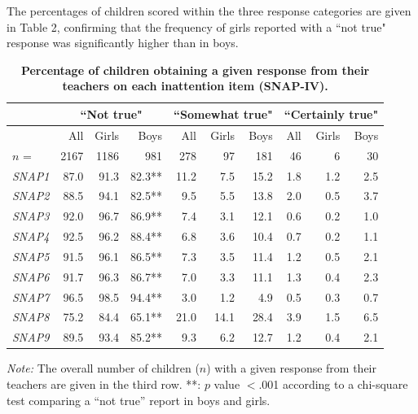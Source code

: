 \documentclass[10pt,letterpaper]{article}
\begin{document}
The percentages of children scored within the three response categories are given in Table 2, confirming that the  frequency of girls reported with a ``not true" response was significantly higher than in boys. \\

\vspace{5mm}

\begin{table}[!ht]
\begin{adjustwidth}{-5mm}{0in}
\centering
\caption{ \bf Percentage of children obtaining a given response from their teachers on each inattention item (SNAP-IV).} 
\vspace{5mm}
\begin{tabular}{|lrrr|rrr|rrr|}
\hline
                & \multicolumn{3}{c|}{``Not true"}  &  \multicolumn{3}{c}{``Somewhat true"}\ &  \multicolumn{3}{|c|}{``Certainly true"}\\ \hline
                    & All  & Girls & Boys  & All   & Girls & Boys & All  & Girls & Boys\\  
                    $n$ = & 2167 & 1186 & 981 & 278 &97 & 181 &46 & 6 &30\\
\hline
{\it SNAP1}   & 87.0 & 91.3 & 82.3**  & 11.2 & 7.5   & 15.2  & 1.8 & 1.2 & 2.5\\  \hline
{\it SNAP2}  &88.5 & 94.1   & 82.5** & 9.5 & 5.5 & 13.8 & 2.0 & 0.5 & 3.7\\  \hline
{\it SNAP3}   & 92.0  &  96.7 &  86.9** & 7.4 & 3.1 & 12.1 & 0.6 & 0.2 & 1.0 \\   \hline
{\it SNAP4}   & 92.5  & 96.2   & 88.4**  & 6.8 & 3.6 & 10.4 & 0.7& 0.2 & 1.1 \\   \hline
{\it SNAP5}  &  91.5 & 96.1 & 86.5**  & 7.3 & 3.5  & 11.4  &1.2 & 0.5 & 2.1  \\   \hline
{\it SNAP6}   & 91.7 & 96.3 & 86.7**  & 7.0 & 3.3 & 11.1 & 1.3 & 0.4 & 2.3 \\   \hline
{\it SNAP7}   & 96.5 & 98.5   & 94.4**   & 3.0  & 1.2 & 4.9 & 0.5 & 0.3 & 0.7 \\   \hline
{\it SNAP8}   & 75.2 & 84.4   & 65.1**  & 21.0  & 14.1  & 28.4 &  3.9 & 1.5 & 6.5\\    \hline
{\it SNAP9}   & 89.5 & 93.4 & 85.2** & 9.3 & 6.2 & 12.7 & 1.2 & 0.4  & 2.1 \\  \hline
\end{tabular}
\label{Numerical_SNAP}
\end{adjustwidth}
\textit{Note:} {The overall number of children ($n$) with a given response from their teachers are given in the third row. **: $p$ value $<$.001 according to a chi-square test comparing a ``not true'' report in boys and girls.} \\ 
\end{table}
\end{document}
